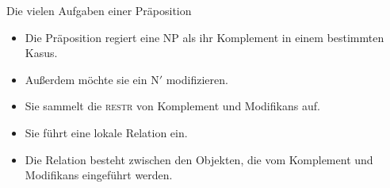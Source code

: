 \begin{frame}
\begin{minipage}{0.525\textwidth}
    Die vielen Aufgaben einer Präposition\\
    \Halbzeile
    \begin{itemize}[<+->]\small
      \item Die Präposition \alert<5>{regiert eine NP als ihr Komplement in einem bestimmten Kasus}.
      \item Außerdem \alert<6>{möchte sie ein N$'$ modifizieren}.
      \item Sie \alert<7>{sammelt die \textsc{restr} von Komplement und Modifikans auf}.
      \item Sie \alert<8>{führt eine lokale Relation ein}.
      \item Die Relation besteht \alert<9>{zwischen den Objekten, die vom Komplement und Modifikans eingeführt werden}.
    \end{itemize}
  \end{minipage}
\end{frame}


